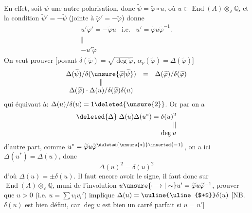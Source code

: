 
En effet, soit $\psi$ une autre polarisation, donc $\widetilde\psi=\widetilde\varphi\circ u$, où $u\in\operatorname{End}(A)\otimes_{\mathbb Z}\mathbb Q$,  et la condition $\widetilde\psi'=-\widetilde\psi$ (jointe à $\widetilde\varphi'=-\widetilde\varphi$) donne
\[
\begin{array}{ccc}
u'\widetilde\varphi'=-\widetilde\varphi u & \text{i.e.} & u'=\widetilde\varphi u\widetilde\varphi^{-1}.\\
\Vert &&\\
-u'\widetilde\varphi &&
\end{array}
\]
On veut prouver [posant $\delta(\widetilde\varphi)=\sqrt{\deg\widetilde\varphi}$, $\alpha_p(\widetilde\varphi)=\Delta(\widetilde\varphi)$]
\[
\begin{array}{ccc}
\Delta(\widetilde\psi)/\delta(\unsure{\widetilde\varphi|\widetilde\psi})&=&\Delta(\widetilde\varphi)/\delta(\widetilde\varphi)\\
\Vert&&\\
\Delta(\widetilde\varphi)\cdot\Delta(u)/\delta(\widetilde\varphi)\delta(u)&&
\end{array}
\]
qui équivaut à: $\Delta(u)/\delta(u)=1\deleted{\unsure{2}}$. Or par  on a
\[
\begin{array}{c}
\deleted{\Delta}\;\Delta(u)\Delta(u^*)=\delta(u)^2\\
\hfill\Vert\\
\hfill\deg u
\end{array}
\]
d'autre part, comme $u^*=\widetilde\varphi u\widetilde\varphi^{\deleted{\unsure{*}}\inserted{-1}}$, on a ici $\Delta(u^*)=\Delta(u)$, donc 
\[
\Delta(u)^2=\delta(u)^2
\]
d'où $\Delta(u)=\pm\delta(u)$. Il faut encore avoir le signe, il faut  donc sur $\operatorname{End}(A)\otimes_{\mathbb Z}\mathbb Q$, muni de l'involution $u\unsure{\longmapsto|\sim}u'=\widetilde\varphi u\widetilde\varphi^{-1}$, prouver que $u>0$ (i.e.  $u=\sum v_iv_i'$)  implique $\Delta(u)={\uuline{\uline{$+$}}}\delta(u)$ [NB. $\delta(u)$ est bien défini, car $\deg u$ est bien un carré parfait si $u=u'$]


